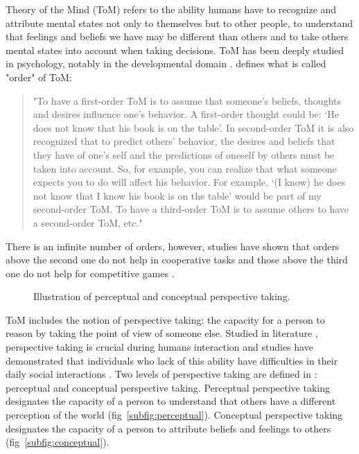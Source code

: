 \documentclass[english,a4paper,11pt,twoside]{StyleThese}
\begin{document}
Theory of the Mind (ToM) refers to the ability humans have to recognize and attribute mental states not only to themselves but to other people, to understand that feelings and beliefs we have may be different than others and to take others mental states into account when taking decisions. ToM has been deeply studied in psychology, notably in the developmental domain \cite{baron1985does, premack1978does}. \cite{verbrugge2008learning} defines what is called "order" of ToM:
\begin{quote}
"To have a first-order ToM is to assume that someone’s beliefs,
thoughts and desires influence one’s behavior. A first-order thought could be: ‘He does not know that his book is on the table’. In second-order ToM it is also recognized that to predict others’ behavior, the desires and beliefs that they have of one’s self and the predictions of oneself by others must be taken into account. So, for example, you can realize that what someone expects you to do will affect his behavior. For example, ‘(I know) he does not know that I know his book is on the table’ would be part of my second-order ToM. To have a third-order ToM is to assume others to have a second-order ToM, etc."
\end{quote}
There is an infinite number of orders, however, studies have shown that orders above the second one do not help in cooperative tasks \cite{de2014theory} and those above the third one do not help for competitive games \cite{de2014theory}.


\begin{figure}[!h]
    \centering
    \caption{Illustration of perceptual and conceptual perspective taking.}
\end{figure}

ToM includes the notion of perspective taking: the capacity for a person to reason by taking the point of view of someone else. Studied in literature \cite{tversky1999speakers, flavell1992perspectives}, perspective taking is crucial during humans interaction and studies have demonstrated that individuals who lack of this ability have difficulties in their daily social interactions \cite{frick2014picturing}. Two levels of perspective taking are defined in \cite{flavell1977development}: perceptual and conceptual perspective taking. Perceptual perspective taking designates the capacity of a person to understand that others have a different perception of the world (fig~\ref{subfig:perceptual}). Conceptual perspective taking designates the capacity of a person to attribute beliefs and feelings to others (fig~\ref{subfig:conceptual}).
\end{document}
